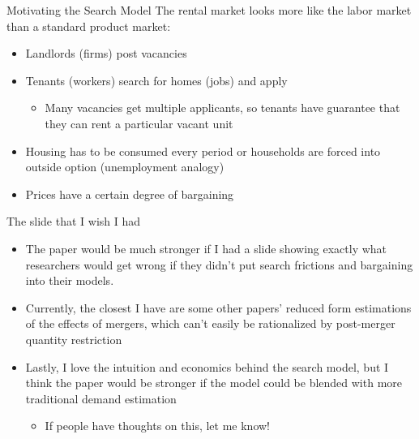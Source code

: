 \documentclass[10pt, xcolor=dvipsnames]{beamer}
\begin{document}
\begin{frame}{Motivating the Search Model}
The rental market looks more like the labor market than a standard product market:\\
    \begin{itemize}
        \item Landlords (firms) post vacancies
        \item Tenants (workers) search for homes (jobs) and apply
        \begin{itemize}
            \item Many vacancies get multiple applicants, so tenants have guarantee that they can rent a particular vacant unit
        \end{itemize}
        \item Housing has to be consumed every period or households are forced into outside option (unemployment analogy)
        \item Prices have a certain degree of bargaining
    \end{itemize}
    
\end{frame}

\begin{frame}{The slide that I wish I had}

\begin{itemize}
    \item The paper would be much stronger if I had a slide showing exactly what researchers would get wrong if they didn't put search frictions and bargaining into their models.
    \item Currently, the closest I have are some other papers' reduced form estimations of the effects of mergers, which can't easily be rationalized by post-merger quantity restriction
    \item Lastly, I love the intuition and economics behind the search model, but I think the paper would be stronger if the model could be blended with more traditional demand estimation
    \begin{itemize}
        \item If people have thoughts on this, let me know!
    \end{itemize}
\end{itemize}
    
\end{frame}
\end{document}
